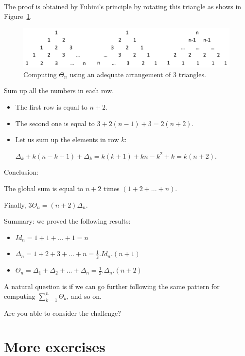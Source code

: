 The proof is obtained by Fubini's principle by rotating this triangle as shows in Figure~\ref{fig:Tetrahedral}.
\begin{figure}[h]
\begin{center}
        \includegraphics[scale=0.5]{FiguresArithmetic/Tetrahedral}
        \caption{Computing $\Theta_n$ using an adequate arrangement of $3$ triangles.}
        \label{fig:Tetrahedral}
\end{center}
\end{figure}

Sum up all the numbers in each row.

\begin{itemize}
\item 
The first row is equal to $n+2$.
\item
The second one is equal to $3 + 2(n-1)+3 = 2(n+2)$. 
\item
Let us sum up the elements in row $k$: 

$\Delta_k + k(n-k+1) + \Delta_k = k(k+1) +kn-k^2+k = k(n+2)$.
\end{itemize}

Conclusion:

The global sum is equal to $n+2$ times $(1+2+...+n)$.

Finally, $3 \Theta_n = (n+2) \Delta_n$.
\bigskip

Summary: we proved the following results:
\begin{itemize}
\item $Id_n = 1+1+ ... +1 = n$
\item $\Delta_n = 1+2+3+ ... +n = \frac{1}{2}.Id_n.(n+1)$
\item $\Theta_n = \Delta_1 + \Delta_2 + ... + \Delta_n = \frac{1}{3} .\Delta_n.(n+2)$
\end{itemize}

A natural question is if we can go further following the same pattern for computing 
$ \sum_{k=1}^{n} \Theta_k$, and so on.

Are you able to consider the challenge?


\section{More exercises}

